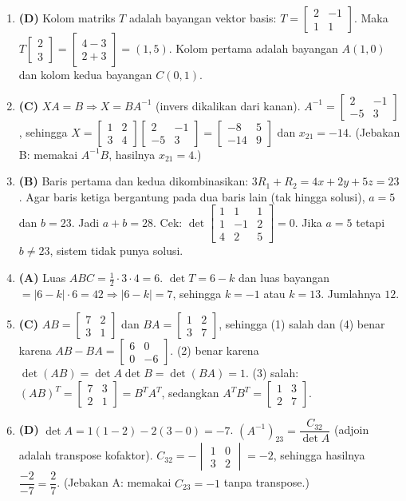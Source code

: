 \documentclass[a4paper,11pt]{article}
\newcommand{\sm}[1]{\left[\begin{smallmatrix}#1\end{smallmatrix}\right]}
\begin{document}
\begin{enumerate}[leftmargin=2em,itemsep=2pt,topsep=2pt]
\item[\textbf{10.}] \textbf{(D)} Kolom matriks $T$ adalah bayangan vektor basis: $T=\sm{2&-1\\1&1}$. Maka $T\begin{bmatrix}2\\3\end{bmatrix}=\begin{bmatrix}4-3\\2+3\end{bmatrix}=(1,5)$. Kolom pertama adalah bayangan $A(1,0)$ dan kolom kedua bayangan $C(0,1)$.
\item[\textbf{11.}] \textbf{(C)} $XA=B\Rightarrow X=BA^{-1}$ (invers dikalikan dari kanan). $A^{-1}=\sm{2&-1\\-5&3}$, sehingga $X=\sm{1&2\\3&4}\sm{2&-1\\-5&3}=\sm{-8&5\\-14&9}$ dan $x_{21}=-14$. (Jebakan B: memakai $A^{-1}B$, hasilnya $x_{21}=4$.)
\item[\textbf{12.}] \textbf{(B)} Baris pertama dan kedua dikombinasikan: $3R_1+R_2=4x+2y+5z=23$. Agar baris ketiga bergantung pada dua baris lain (tak hingga solusi), $a=5$ dan $b=23$. Jadi $a+b=28$. Cek: $\det\sm{1&1&1\\1&-1&2\\4&2&5}=0$. Jika $a=5$ tetapi $b\neq23$, sistem tidak punya solusi.
\item[\textbf{13.}] \textbf{(A)} Luas $ABC=\frac12\cdot3\cdot4=6$. $\det T=6-k$ dan luas bayangan $=|6-k|\cdot6=42\Rightarrow|6-k|=7$, sehingga $k=-1$ atau $k=13$. Jumlahnya $12$.
\item[\textbf{14.}] \textbf{(C)} $AB=\sm{7&2\\3&1}$ dan $BA=\sm{1&2\\3&7}$, sehingga (1) salah dan (4) benar karena $AB-BA=\sm{6&0\\0&-6}$. (2) benar karena $\det(AB)=\det A\det B=\det(BA)=1$. (3) salah: $(AB)^T=\sm{7&3\\2&1}=B^TA^T$, sedangkan $A^TB^T=\sm{1&3\\2&7}$.
\item[\textbf{15.}] \textbf{(D)} $\det A=1(1-2)-2(3-0)=-7$. $(A^{-1})_{23}=\dfrac{C_{32}}{\det A}$ (adjoin adalah transpose kofaktor). $C_{32}=-\begin{vmatrix}1&0\\3&2\end{vmatrix}=-2$, sehingga hasilnya $\dfrac{-2}{-7}=\dfrac27$. (Jebakan A: memakai $C_{23}=-1$ tanpa transpose.)

\end{enumerate}
\end{document}
